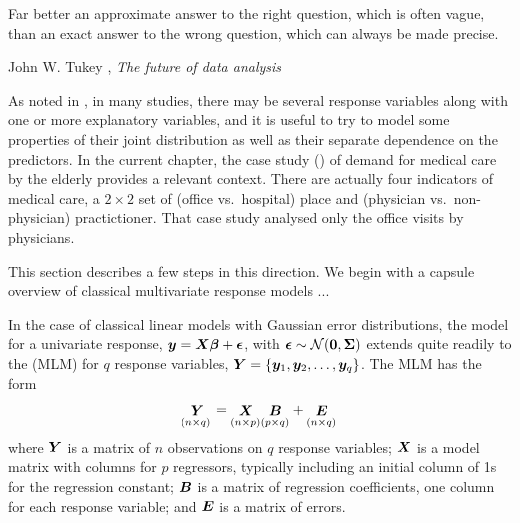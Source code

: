\documentclass[11pt]{book}\usepackage[]{graphicx}\usepackage[]{color}
\begin{document}
\epigraph{Far better an approximate answer to the right question,
which is often vague, than an exact answer to the wrong question,
which can always be made precise.}{John W. Tukey \citeyearpar{Tukey:1962}, \emph{The future of data analysis}}


As noted in , in many studies, there may be 
several response variables along with one or more explanatory variables,
and it is useful to try to model some properties
of their joint distribution as well as their separate dependence on
the predictors.  
In the current chapter, the case study ()
of demand for medical care by the elderly provides a relevant context.
There are actually four indicators of medical care, a $2 \times 2$ set of
(office vs.\ hospital) place and (physician vs.\ non-physician) practictioner.
That case study analysed only the office visits by physicians.

This section describes a few steps in this direction.  We begin with a capsule
overview of classical multivariate response models ...

In the case of classical linear models with Gaussian error distributions, the
model for a univariate response, $\bm{y} = \bm{X} \bm{\beta} + \bm{\epsilon}$,
with 
$\bm{\epsilon} \sim \mathcal{N} (\bm{0}, \bm{\Sigma})$
extends quite readily to the  (MLM) for $q$ response variables,
$\bm{Y} = \{ \bm{y}_1, \bm{y}_2, \dots , \bm{y}_q \}$.  The MLM has the form
\begin{equation*}
\mathord{\mathop{\bm{Y}}\limits_{(n\times q)}} = \mathord{\mathop{\bm{X}}\limits_{(n\times p)}} \mathord{\mathop{\bm{B}}\limits_{(p\times q)}} + 
\mathord{\mathop{\bm{E}}\limits_{(n\times q)}}
\end{equation*}
where $\bm{Y}$ is a matrix of $n$ observations on $q$ response variables; $\bm{X}$ is a model matrix with columns for $p$ regressors, typically including an initial column of 1s for the regression constant;
$\bm{B}$ is a matrix of regression coefficients, one column for each response variable; and $\bm{E}$ is a matrix of errors. 
\end{document}
